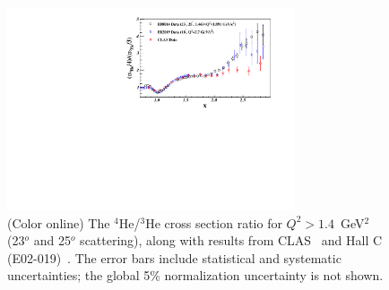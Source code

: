 \documentclass[aps,prl,superscriptaddress,showpacs,twocolumn,floatfix,amsmath,amssymb]{revtex4-1}
\begin{document}
%



%
            \begin{figure}[!ht]
		\begin{center}
		  \includegraphics[width=8.5cm,angle=0]{He4_He3_XS_Ratio.pdf}
		\end{center}
		\vspace*{-5mm}
		\caption{(Color online) The $^4$He/$^3$He cross section ratio for $Q^2>1.4$~GeV$^2$ (23$^o$ and 25$^o$ scattering),
                  along with results from CLAS~\cite{PhysRevLett.96.082501} and Hall C (E02-019)~\cite{fomin2012}. The error bars include
                  statistical and systematic uncertainties; the global 5\% normalization uncertainty is not shown.}
		\label{fig:ratios_highqsq}
		\end{figure}
\end{document}
